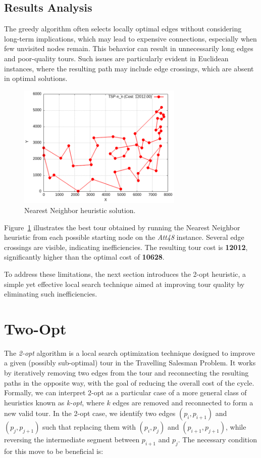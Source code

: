 \subsection{Results Analysis}
\label{sec:nn-analysis}
The greedy algorithm often selects locally optimal edges without considering long-term implications, which may lead to expensive connections, 
especially when few unvisited nodes remain. This behavior can result in unnecessarily long edges and poor-quality tours. Such issues are particularly 
evident in Euclidean instances, where the resulting path may include edge crossings, which are absent in optimal solutions.

\begin{figure}[h!]
    \centering
    \includegraphics[width=0.7\textwidth]{images/TSP_n_n.png}
    \caption{Nearest Neighbor heuristic solution.}
    \label{fig:nn-example}
\end{figure}

Figure~\ref{fig:nn-example} illustrates the best tour obtained by running the Nearest Neighbor heuristic from each possible starting node on the \textit{Att48} instance. Several edge crossings are visible, indicating inefficiencies. The resulting tour cost is \textbf{12012}, significantly higher than the optimal cost of \textbf{10628}.

To address these limitations, the next section introduces the 2-opt heuristic, a simple yet effective local search technique aimed at improving tour quality by eliminating such inefficiencies.

\section{Two-Opt}

The \textit{2-opt} algorithm is a local search optimization technique designed to improve a given (possibly sub-optimal) tour 
in the Travelling Salesman Problem. It works by iteratively removing two edges from the tour and reconnecting the resulting paths 
in the opposite way, with the goal of reducing the overall cost of the cycle.
Formally, we can interpret 2-opt as a particular case of a more general class of heuristics known as \textit{k-opt}, 
where $k$ edges are removed and reconnected to form a new valid tour. In the 2-opt case, we identify two edges $(p_i, p_{i+1})$ 
and $(p_j, p_{j+1})$ such that replacing them with $(p_i, p_j)$ and $(p_{i+1}, p_{j+1})$, while reversing the intermediate segment between $p_{i+1}$ and $p_j$. 
The necessary condition for this move to be beneficial is:

